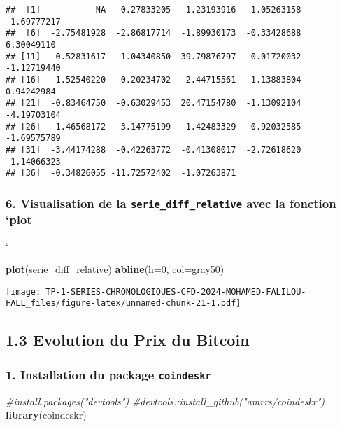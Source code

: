 \documentclass[
]{article}
\newenvironment{Shaded}{\begin{snugshade}}{\end{snugshade}}
\newcommand{\AttributeTok}[1]{\textcolor[rgb]{0.13,0.29,0.53}{#1}}
\newcommand{\CommentTok}[1]{\textcolor[rgb]{0.56,0.35,0.01}{\textit{#1}}}
\newcommand{\DecValTok}[1]{\textcolor[rgb]{0.00,0.00,0.81}{#1}}
\newcommand{\FunctionTok}[1]{\textcolor[rgb]{0.13,0.29,0.53}{\textbf{#1}}}
\newcommand{\NormalTok}[1]{#1}
\newcommand{\StringTok}[1]{\textcolor[rgb]{0.31,0.60,0.02}{#1}}
\begin{document}
\begin{verbatim}
##  [1]           NA   0.27833205  -1.23193916   1.05263158  -1.69777217
##  [6]  -2.75481928  -2.86817714  -1.89930173  -0.33428688   6.30049110
## [11]  -0.52831617  -1.04340850 -39.79876797  -0.01720032  -1.12719440
## [16]   1.52540220   0.20234702  -2.44715561   1.13883804   0.94242984
## [21]  -0.83464750  -0.63029453  20.47154780  -1.13092104  -4.19703104
## [26]  -1.46568172  -3.14775199  -1.42483329   0.92032585  -1.69575789
## [31]  -3.44174288  -0.42263772  -0.41308017  -2.72618620  -1.14066323
## [36]  -0.34826055 -11.72572402  -1.07263871
\end{verbatim}

\subsubsection{\texorpdfstring{6. Visualisation de la
\texttt{serie\_diff\_relative} avec la fonction
`plot}{6. Visualisation de la serie\_diff\_relative avec la fonction `plot}}\label{visualisation-de-la-serie_diff_relative-avec-la-fonction-plot}

`

\begin{Shaded}
\begin{Highlighting}[]
\FunctionTok{plot}\NormalTok{(serie\_diff\_relative)}
\FunctionTok{abline}\NormalTok{(}\AttributeTok{h=}\DecValTok{0}\NormalTok{, }\AttributeTok{col=}\StringTok{\textquotesingle{}gray50\textquotesingle{}}\NormalTok{)}
\end{Highlighting}
\end{Shaded}

\texttt{[image: TP-1-SERIES-CHRONOLOGIQUES-CFD-2024-MOHAMED-FALILOU-FALL\_files/figure-latex/unnamed-chunk-21-1.pdf]}

\subsection{1.3 Evolution du Prix du
Bitcoin}\label{evolution-du-prix-du-bitcoin}

\subsubsection{\texorpdfstring{1. Installation du package
\texttt{coindeskr}}{1. Installation du package coindeskr}}\label{installation-du-package-coindeskr}

\begin{Shaded}
\begin{Highlighting}[]
\CommentTok{\#install.packages("devtools")}
\CommentTok{\#devtools::install\_github("amrrs/coindeskr")}
\FunctionTok{library}\NormalTok{(coindeskr)}
\end{Highlighting}
\end{Shaded}
\end{document}
